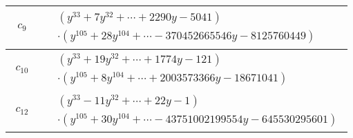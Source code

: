 \documentclass[1p]{elsarticle_modified}
\theoremstyle{definition}
\begin{document}
\begin{tabular}{m{50pt}|m{274pt}}
\hline $$\begin{aligned}c_{9}\end{aligned}$$&$\begin{aligned}
&(y^{33}+7 y^{32}+\cdots+2290 y-5041)\\
&\cdot(y^{105}+28 y^{104}+\cdots-370452665546 y-8125760449)
\end{aligned}$\\
\hline $$\begin{aligned}c_{10}\end{aligned}$$&$\begin{aligned}
&(y^{33}+19 y^{32}+\cdots+1774 y-121)\\
&\cdot(y^{105}+8 y^{104}+\cdots+2003573366 y-18671041)
\end{aligned}$\\
\hline $$\begin{aligned}c_{12}\end{aligned}$$&$\begin{aligned}
&(y^{33}-11 y^{32}+\cdots+22 y-1)\\
&\cdot(y^{105}+30 y^{104}+\cdots-43751002199554 y-645530295601)
\end{aligned}$\\
\hline
\end{tabular}
\vskip 2pc
\end{document}
